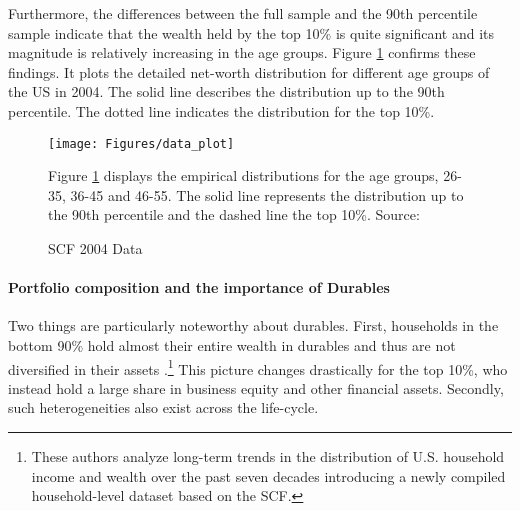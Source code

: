 \documentclass[a4paper,12pt,legno]{article}
\begin{document}
Furthermore, the differences between the full sample and the 90th percentile sample indicate that the wealth held by the top 10\% is quite significant and its magnitude is relatively increasing in the age groups. Figure \ref{scf_data} confirms these findings. It plots the detailed net-worth distribution for different age groups of the US in 2004. The solid line describes the distribution up to the 90th percentile. The dotted line indicates the distribution for the top 10\%. 
\begin{figure}[!htbp]
\caption{SCF 2004 Data} 
\label{scf_data}	%
\centering
\texttt{[image: Figures/data\_plot]}  %

\begin{minipage}{0.8\linewidth}
\footnotesize{Figure \ref{scf_data} displays the empirical distributions for the age groups, 26-35, 36-45 and 46-55. The solid line represents the distribution up to the 90th percentile and the dashed line the top 10\%. Source: \cite{hintermaier2011}}
\end{minipage}

\end{figure}

\paragraph{Portfolio composition and the importance of Durables}
Two things are particularly noteworthy about durables. First, households in the bottom 90\% hold almost their entire wealth in durables and thus are not diversified in their assets \citep{kuhn2017income}.\footnote{These authors analyze long-term trends in the distribution of U.S. household income and wealth over the past seven decades introducing a newly compiled household-level dataset based on the SCF.} This picture changes drastically for the top 10\%, who instead hold a large share in business equity and other financial assets. Secondly, such heterogeneities also exist across the life-cycle. 
\end{document}
